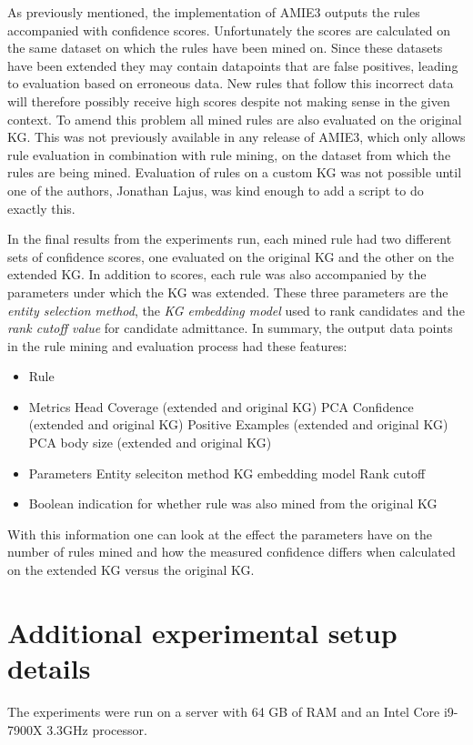 As previously mentioned, the implementation of AMIE3 outputs the rules accompanied with confidence scores. Unfortunately the scores are calculated on the same dataset on which the rules have been mined on. Since these datasets have been extended they may contain datapoints that are false positives, leading to evaluation based on erroneous data. New rules that follow this incorrect data will therefore possibly receive high scores despite not making sense in the given context. To amend this problem all mined rules are also evaluated on the original KG.
This was not previously available in any release of AMIE3, which only allows rule evaluation in combination with rule mining, on the dataset from which the rules are being mined. Evaluation of rules on a custom KG was not possible until one of the authors, Jonathan Lajus, was kind enough to add a script to do exactly this.

In the final results from the experiments run, each mined rule had two different sets of confidence scores, one evaluated on the original KG and the other on the extended KG. In addition to scores, each rule was also accompanied by the parameters under which the KG was extended. These three parameters are the \textit{entity selection method}, the \textit{KG embedding model} used to rank candidates and the \textit{rank cutoff value} for candidate admittance. In summary, the output data points in the rule mining and evaluation process had these features:
\begin{itemize}
    \item Rule
    \item Metrics
        \subitem Head Coverage (extended and original KG)
        \subitem PCA Confidence (extended and original KG)
        \subitem Positive Examples (extended and original KG)
        \subitem PCA body size (extended and original KG)
    \item Parameters
        \subitem Entity seleciton method
        \subitem KG embedding model
        \subitem Rank cutoff
    \item Boolean indication for whether rule was also mined from the original KG
\end{itemize}

With this information one can look at the effect the parameters have on the number of rules mined and how the measured confidence differs when calculated on the extended KG versus the original KG.


\section{Additional experimental setup details}
The experiments were run on a server with 64 GB of RAM and an Intel Core i9-7900X 3.3GHz processor.

